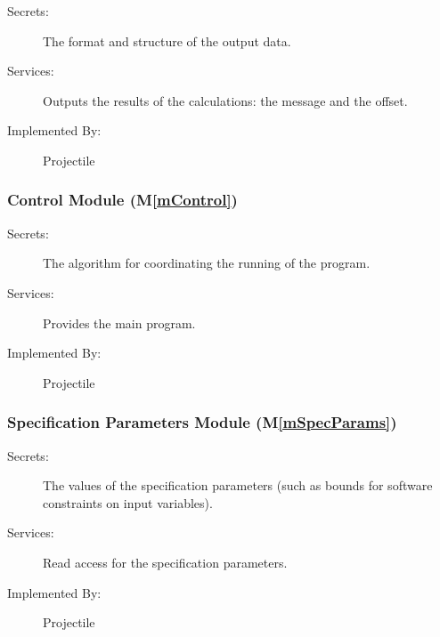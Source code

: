 \documentclass[12pt]{article}
\newcommand{\mref}[1]{M\ref{#1}}
\begin{document}
\begin{description}
\item[Secrets:] The format and structure of the output data.
\item[Services:] Outputs the results of the calculations: the message and the offset.
\item[Implemented By:] Projectile
\end{description} 

%

\subsubsection{Control Module (\mref{mControl})}

\begin{description}
\item[Secrets:] The algorithm for coordinating the running of the program.
\item[Services:] Provides the main program.
\item[Implemented By:] Projectile
\end{description}
 
\subsubsection{Specification Parameters Module (\mref{mSpecParams})}

\begin{description}
\item[Secrets:] The values of the specification parameters (such as bounds for
  software constraints on input variables).
\item[Services:] Read access for the specification parameters.
\item[Implemented By:] Projectile
\end{description}
\end{document}
